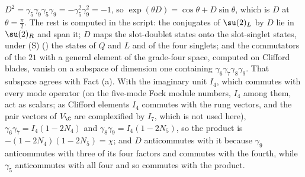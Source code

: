 $D^{2} = \gamma_{5}\gamma_{9}\gamma_{5}\gamma_{9} = -\gamma_{5}^{2}\gamma_{9}^{2} = -1$, so $\exp(\theta D) = \cos\theta + D\sin\theta$, which is $D$ at $\theta = \tfrac{\pi}{2}$. The rest is computed in the script: the conjugates of $\su(2)_{L}$ by $D$ lie in $\su(2)_{R}$ and span it; $D$ maps the slot-doublet states onto the slot-singlet states, under (S) () the states of $Q$ and $L$ and of the four singlets; and the commutators of the $21$ with a general element of the grade-four space, computed on Clifford blades, vanish on a subspace of dimension one containing $\gamma_{6}\gamma_{7}\gamma_{8}\gamma_{9}$. That subspace agrees with Fact (a). With the imaginary unit $I_{4}$, which commutes with every mode operator (on the five-mode Fock module numbers, $I_{4}$ among them, act as scalars; as Clifford elements $I_{4}$ commutes with the rung vectors, and the pair vectors of $V_{\C}$ are complexified by $I_{7}$, which is not used here), $\gamma_{6}\gamma_{7} = I_{4}(1 - 2N_{4})$ and $\gamma_{8}\gamma_{9} = I_{4}(1 - 2N_{5})$, so the product is $-(1 - 2N_{4})(1 - 2N_{5}) = \chi$; and $D$ anticommutes with it because $\gamma_{9}$ anticommutes with three of its four factors and commutes with the fourth, while $\gamma_{5}$ anticommutes with all four and so commutes with the product.
